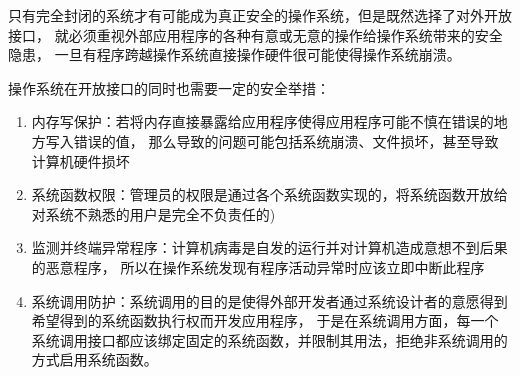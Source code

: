只有完全封闭的系统才有可能成为真正安全的操作系统，但是既然选择了对外开放接口，
就必须重视外部应用程序的各种有意或无意的操作给操作系统带来的安全隐患，
一旦有程序跨越操作系统直接操作硬件很可能使得操作系统崩溃。

操作系统在开放接口的同时也需要一定的安全举措：
\begin{enumerate}
    \item 内存写保护：若将内存直接暴露给应用程序使得应用程序可能不慎在错误的地方写入错误的值，
    那么导致的问题可能包括系统崩溃、文件损坏，甚至导致计算机硬件损坏
    \item 系统函数权限：管理员的权限是通过各个系统函数实现的，将系统函数开放给对系统不熟悉的用户是完全不负责任的)
    \item 监测并终端异常程序：计算机病毒是自发的运行并对计算机造成意想不到后果的恶意程序，
    所以在操作系统发现有程序活动异常时应该立即中断此程序
    \item 系统调用防护：系统调用的目的是使得外部开发者通过系统设计者的意愿得到希望得到的系统函数执行权而开发应用程序，
    于是在系统调用方面，每一个系统调用接口都应该绑定固定的系统函数，并限制其用法，拒绝非系统调用的方式启用系统函数。
\end{enumerate}